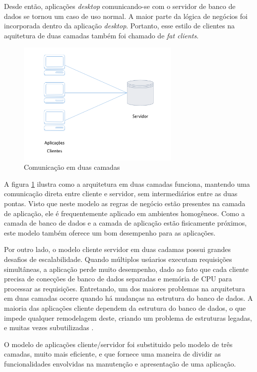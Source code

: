 Desde então, aplicações \textit{desktop} comunicando-se com o servidor de banco de dados se tornou um caso de uso normal. A maior parte da lógica de negócios foi incorporada dentro da aplicação \textit{desktop}. Portanto, esse estilo de clientes na aquitetura de duas camadas também foi chamado de \textit{fat clients}.

\begin{figure}[htbp]
    \centering
    \includegraphics[width=0.7\textwidth]{figuras/client-server.png}
    \caption{Comunicação em duas camadas}
    \label{fig:two-tier}
\end{figure}

A figura \ref{fig:two-tier} ilustra como a arquitetura em duas camadas funciona, mantendo uma comunicação direta entre cliente e servidor, sem intermediários entre as duas pontas. Visto que neste modelo as regras de negócio estão presentes na camada de aplicação, ele é frequentemente aplicado em ambientes homogêneos. Como a camada de banco de dados e a camada de aplicação estão fisicamente próximos, este modelo também oferece um bom desempenho para as aplicações.

Por outro lado, o modelo cliente servidor em duas cadamas possui grandes desafios de escalabilidade. Quando múltiplos usúarios executam requisições simultâneas, a aplicação perde muito desempenho, dado ao fato que cada cliente precisa de conecções de banco de dados separadas e memória de CPU para processar as requisições. Entretando, um dos maiores problemas na arquitetura em duas camadas ocorre quando há mudanças na estrutura do banco de dados. A maioria das aplicações cliente dependem da estrutura do banco de dados, o que impede qualquer remodelagem deste, criando um problema de estruturas legadas, e muitas vezes subutilizadas \cite{two-tier-differences}.

O modelo de aplicações cliente/servidor foi substituido pelo modelo de três camadas, muito mais eficiente, e que fornece uma maneira de dividir as funcionalidades envolvidas na manutenção e apresentação de uma aplicação.

